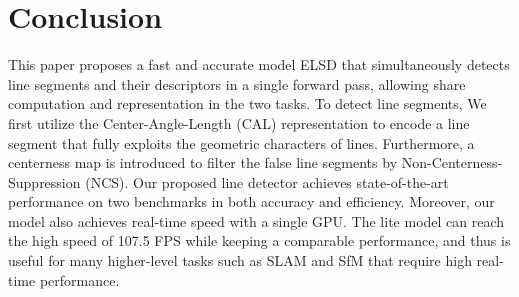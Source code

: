 \documentclass[10pt,twocolumn,letterpaper]{article}
\begin{document}
\section{Conclusion}
This paper proposes a fast and accurate model ELSD that simultaneously detects line segments and their descriptors in a single forward pass, allowing share computation and representation in the two tasks. To detect line segments, We first utilize the Center-Angle-Length (CAL) representation to encode a line segment that fully exploits the geometric characters of lines. Furthermore, a centerness map is introduced to filter the false line segments by Non-Centerness-Suppression (NCS). Our proposed line detector achieves state-of-the-art performance on two benchmarks in both accuracy and efficiency. Moreover, our model also achieves real-time speed with a single GPU. The lite model can reach the high speed of 107.5 FPS while keeping a comparable performance, and thus is useful for many higher-level tasks such as SLAM and SfM that require high real-time performance.


\newpage
{\small


}
\end{document}
